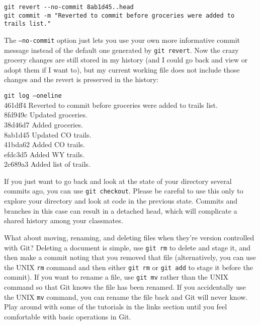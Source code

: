 \documentclass[12pt, letterpaper]{article}
\newcommand{\code}{\texttt}
\begin{document}
\begin{verbatim}
git revert --no-commit 8ab1d45..head
git commit -m "Reverted to commit before groceries were added to trails list."
\end{verbatim}

The \code{--no-commit} option just lets you use your own more informative commit message instead of the default one generated by \code{git revert}.  Now the crazy grocery changes are still stored in my history (and I could go back and view or adopt them if I want to), but my current working file does not include those changes and the revert is preserved in the history: 

\begin{flushleft}
\code{git log --oneline} \\
461dff4 Reverted to commit before groceries were added to trails list. \\
8fd949c Updated groceries. \\
38d46d7 Added groceries. \\
8ab1d45 Updated CO trails.\\
41bda62 Added CO trails.\\
efdc3d5 Added WY trails.\\
2c689a3 Added list of trails.\\
\end{flushleft}

If you just want to go back and look at the state of your directory several commits ago, you can use \code{git checkout}.  Please be careful to use this only to explore your directory and look at code in the previous state.  Commits and branches in this case can result in a detached head, which will complicate a shared history among your classmates.

What about moving, renaming, and deleting files when they're version controlled with Git?  Deleting a document is simple, use \code{git rm} to delete and stage it, and then make a commit noting that you removed that file (alternatively, you can use the UNIX \code{rm} command and then either \code{git rm} or \code{git add} to stage it before the commit).  If you want to rename a file, use \code{git mv} rather than the UNIX command so that Git knows the file has been renamed.  If you accidentally use the UNIX \code{mv} command, you can rename the file back and Git will never know.  Play around with some of the tutorials in the links section until you feel comfortable with basic operations in Git. 

\hypertarget{refbkmk4}{}
\end{document}
